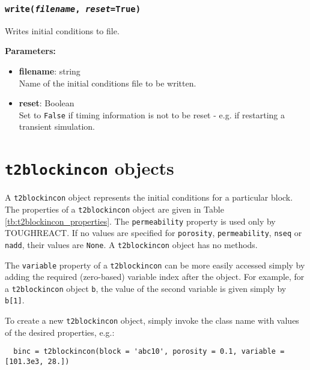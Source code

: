 \begin{snugshade}
\subsubsection{\texttt{write(\emph{filename}, \emph{reset}=True)}}
\end{snugshade}
\label{sec:t2incon:write}

Writes initial conditions to file.

\textbf{Parameters:}
\begin{itemize}
\item \textbf{filename}: string\\
  Name of the initial conditions file to be written.
\item \textbf{reset}: Boolean\\
  Set to \texttt{False} if timing information is not to be reset - e.g. if restarting a transient simulation.
\end{itemize}

\section{\texttt{t2blockincon} objects}
\label{t2blockincons}

A \texttt{t2blockincon} object represents the initial conditions for a particular block.  The properties of a \texttt{t2blockincon} object are given in Table \ref{tb:t2blockincon_properties}. The \texttt{permeability} property is used only by TOUGHREACT.  If no values are specified for \texttt{porosity}, \texttt{permeability}, \texttt{nseq} or \texttt{nadd}, their values are \texttt{None}. A \texttt{t2blockincon} object has no methods.

The \texttt{variable} property of a \texttt{t2blockincon} can be more easily accessed simply by adding the required (zero-based) variable index after the object.  For example, for a \texttt{t2blockincon} object \texttt{b}, the value of the second variable is given simply by \texttt{b[1]}.

To create a new \texttt{t2blockincon} object, simply invoke the class name with values of the desired properties, e.g.:

\begin{lstlisting}
  binc = t2blockincon(block = 'abc10', porosity = 0.1, variable = [101.3e3, 28.])
\end{lstlisting}

